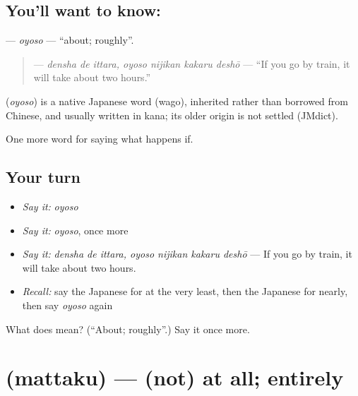\subsection*{You'll want to know: }
\textbf{} — \emph{oyoso} — \textquotedblleft{}about; roughly\textquotedblright{}.

\begin{quote}
\textbf{   } — \emph{densha de ittara, oyoso nijikan kakaru deshō} — \textquotedblleft{}If you go by train, it will take about two hours.\textquotedblright{}
\end{quote}

\begin{cousinweb}
\textbf{} (\emph{oyoso}) is a native Japanese word (wago), inherited rather than borrowed from Chinese, and usually written in kana; its older origin is not settled (JMdict).
\end{cousinweb}

\begin{grammarlens}[title={What you've built}]
One more word for saying what happens if.
\end{grammarlens}

\subsection*{Your turn}
\begin{itemize}
\raggedright
  \item \emph{Say it:} \emph{oyoso}
  \item \emph{Say it:} \emph{oyoso}, once more
  \item \emph{Say it:} \emph{densha de ittara, oyoso nijikan kakaru deshō} — If you go by train, it will take about two hours.
  \item \emph{Recall:} say the Japanese for at the very least, then the Japanese for nearly, then say \emph{oyoso} again
\end{itemize}

\begin{tcolorbox}[breakable,colback=teal!4,colframe=teal!35!black,title={Before you move on}]
What does  mean? (\textquotedblleft{}About; roughly\textquotedblright{}.) Say it once more.
\end{tcolorbox}
\section[\texorpdfstring{\ja{まったく} (mattaku)}{まったく (mattaku)}]{ (mattaku) — (not) at all; entirely}

